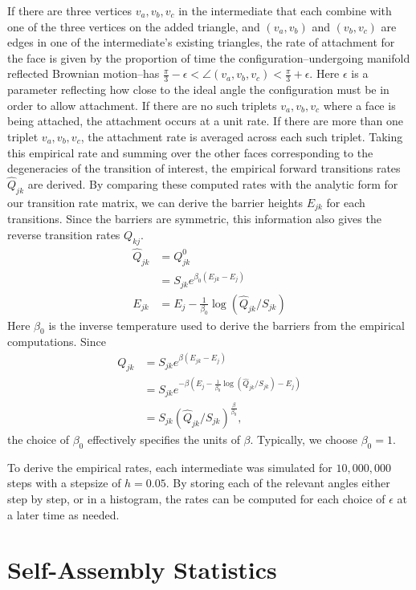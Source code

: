 If there are three vertices $v_a, v_b, v_c$ in the intermediate that each combine with one of the three vertices on the added triangle, and $(v_a, v_b)$ and $(v_b, v_c)$ are edges in one of the intermediate's existing triangles, the rate of attachment for the face is given by the proportion of time the configuration--undergoing manifold reflected Brownian motion--has $\frac{\pi}{3} - \epsilon < \angle( v_a, v_b, v_c) < \frac{\pi}{3} + \epsilon$. Here $\epsilon$ is a parameter reflecting how close to the ideal angle the configuration must be in order to allow attachment. If there are no such triplets $v_a, v_b, v_c$ where a face is being attached, the attachment occurs at a unit rate. If there are more than one triplet $v_a, v_b, v_c$, the attachment rate is averaged across each such triplet. Taking this empirical rate and summing over the other faces corresponding to the degeneracies of the transition of interest, the empirical forward transitions rates $\hat{Q}_{jk}$ are derived. By comparing these computed rates with the analytic form for our transition rate matrix, we can derive the barrier heights $E_{jk}$ for each transitions. Since the barriers are symmetric, this information also gives the reverse transition rates $Q_{kj}$.
\begin{align}
\hat{Q}_{jk} &= Q^0_{jk} \\
	&= S_{jk}e^{\beta_0(E_{jk} - E_j)} \\
E_{jk} &= E_j-\frac{1}{\beta_0}\log\left(\hat{Q}_{jk}/S_{jk}\right)
\end{align}
Here $\beta_0$ is the inverse temperature used to derive the barriers from the empirical computations. Since 
\begin{align}
Q_{jk} 	&= S_{jk}e^{\beta(E_{jk} - E_j)} \\
 &= S_{jk} e^{-\beta\left(E_j-\frac{1}{\beta_0}\log\left(\hat{Q}_{jk}/S_{jk}\right) - E_j\right)} \\
 &= S_{jk}\left(\hat{Q}_{jk}/S_{jk}\right)^{\frac{\beta}{\beta_0}},
\end{align}
the choice of $\beta_0$ effectively specifies the units of $\beta$. Typically, we choose $\beta_0 = 1$.

To derive the empirical rates, each intermediate was simulated for $10,000,000$ steps with a stepsize of $h = 0.05$. By storing each of the relevant angles either step by step, or in a histogram, the rates can be computed for each choice of $\epsilon$ at a later time as needed.

\section{Self-Assembly Statistics}

